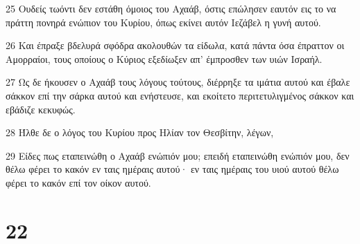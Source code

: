 \par 25 Ουδείς τωόντι δεν εστάθη όμοιος του Αχαάβ, όστις επώλησεν εαυτόν εις το να πράττη πονηρά ενώπιον του Κυρίου, όπως εκίνει αυτόν Ιεζάβελ η γυνή αυτού.
\par 26 Και έπραξε βδελυρά σφόδρα ακολουθών τα είδωλα, κατά πάντα όσα έπραττον οι Αμορραίοι, τους οποίους ο Κύριος εξεδίωξεν απ' έμπροσθεν των υιών Ισραήλ.
\par 27 Ως δε ήκουσεν ο Αχαάβ τους λόγους τούτους, διέρρηξε τα ιμάτια αυτού και έβαλε σάκκον επί την σάρκα αυτού και ενήστευσε, και εκοίτετο περιτετυλιγμένος σάκκον και εβάδιζε κεκυφώς.
\par 28 Ήλθε δε ο λόγος του Κυρίου προς Ηλίαν τον Θεσβίτην, λέγων,
\par 29 Είδες πως εταπεινώθη ο Αχαάβ ενώπιόν μου; επειδή εταπεινώθη ενώπιόν μου, δεν θέλω φέρει το κακόν εν ταις ημέραις αυτού· εν ταις ημέραις του υιού αυτού θέλω φέρει το κακόν επί τον οίκον αυτού.

\chapter{22}

